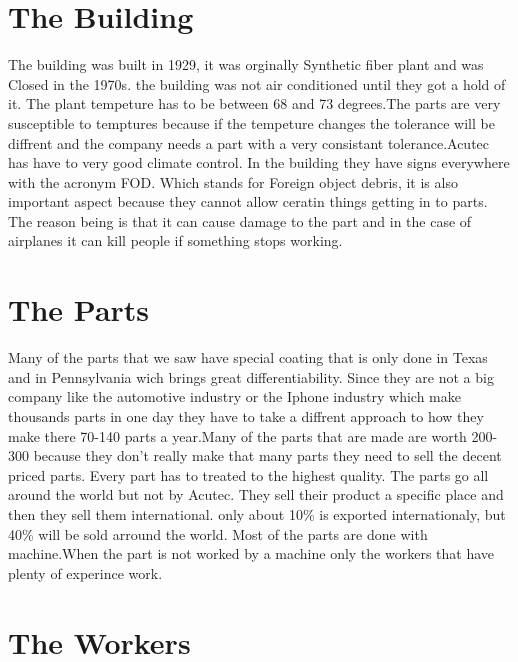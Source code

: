 \documentclass[12pt]{article}
\begin{document}
\section{The Building}

                                         
  The building was built in 1929, it was orginally  Synthetic fiber plant and was Closed in the 1970s. the building was not air conditioned until they got a hold of it. The plant tempeture has to be between 68 and 73 degrees.The parts are very susceptible to temptures because if the tempeture changes the tolerance will be diffrent and the company needs a part with a very consistant tolerance.Acutec has have to very good climate control. In the building they have signs everywhere with the acronym FOD. Which stands for Foreign object debris, it is also important aspect because they cannot allow ceratin things getting in to parts. The reason being is that it can cause damage to the part and in the case of airplanes it can kill people if something stops working.\cite{FOD}               
  
\section{The Parts}

Many of the parts that we saw have special coating that is only done in Texas and in Pennsylvania wich brings great differentiability. Since they are not a big company  like the automotive industry or the Iphone industry which make thousands parts in one day they have to take a diffrent approach to how they make there 70-140 parts a year.Many of the parts that are made are worth 200-300 because they don't really make that many parts they need to sell the decent priced parts. Every part has to treated to the highest quality. The parts go all around the world but not by Acutec. They sell their product a specific place and then they sell them international. only about 10\% is exported internationaly, but 40\% will be sold arround the world.  
Most of the parts are done with machine.When the part is not worked by a machine only the workers that have plenty of experince work.  

\section{The Workers}
\end{document}
